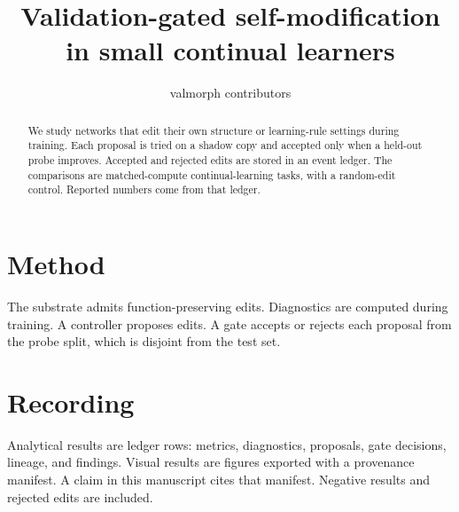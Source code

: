\documentclass{article}
\title{Validation-gated self-modification in small continual learners}
\author{valmorph contributors}
\date{}
\begin{document}
\maketitle

\begin{abstract}
We study networks that edit their own structure or learning-rule settings during training.
Each proposal is tried on a shadow copy and accepted only when a held-out probe improves.
Accepted and rejected edits are stored in an event ledger.
The comparisons are matched-compute continual-learning tasks, with a random-edit control.
Reported numbers come from that ledger.
\end{abstract}

\section{Method}
The substrate admits function-preserving edits.
Diagnostics are computed during training.
A controller proposes edits.
A gate accepts or rejects each proposal from the probe split, which is disjoint from the test set.

\section{Recording}
Analytical results are ledger rows: metrics, diagnostics, proposals, gate decisions, lineage, and findings.
Visual results are figures exported with a provenance manifest.
A claim in this manuscript cites that manifest.
Negative results and rejected edits are included.



\end{document}
